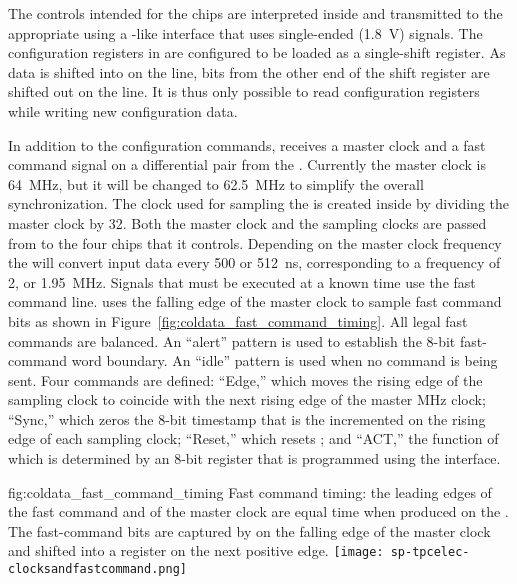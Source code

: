 The controls intended for the   chips are interpreted 
inside  and transmitted to the appropriate  using 
a -like interface that uses single-ended (\SI{1.8}{V})  
signals. The configuration registers in  are configured to be 
loaded as a single-shift register. As data is shifted into  on 
the  line, bits from the other end of the shift register are shifted 
out on the  line. It is thus only possible to read  
configuration registers while writing new configuration data.

In addition to the configuration commands,  %
receives a master clock and a fast command signal on a  
differential pair from
the . Currently the master clock is \SI{64}{MHz}, but it will be
changed to \SI{62.5}{MHz} to simplify the overall   
synchronization. The clock used for sampling the  is created inside
 by dividing the master clock by \num{32}. Both the master clock and
the  sampling clocks are passed from  to the four
 chips that it controls. Depending on the master clock frequency
the  will convert input data every \num{500} or \SI{512}{ns}, 
corresponding to a frequency of \num{2}, or \SI{1.95}{MHz}. Signals that must be
executed at a known time use the fast command line.  
uses the falling edge of the master clock to sample fast command bits as shown 
in Figure~\ref{fig:coldata_fast_command_timing}. All legal fast commands 
are  balanced. An ``alert'' pattern is used to establish the 8-bit 
fast-command word boundary. An ``idle'' pattern is used when no command is being 
sent. Four commands are defined: ``Edge,'' which moves the rising edge of the 
 sampling clock to coincide with the next rising edge of the 
master MHz clock; ``Sync,'' which zeros the \num{8}-bit timestamp that is the incremented 
on the rising edge of each  sampling clock; ``Reset,'' which resets 
; and ``ACT,'' the function of which is determined by an \num{8}-bit 
register that is programmed using the  interface.  

\begin{dunefigure}
{fig:coldata_fast_command_timing}
{Fast command timing: the leading edges of the fast command and of the master 
clock are equal time when produced on the . The fast-command bits 
are captured by  on the falling edge of the master clock and 
shifted into a register on the next positive edge.}
\texttt{[image: sp-tpcelec-clocksandfastcommand.png]}
\end{dunefigure}

